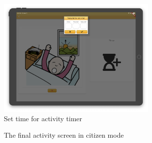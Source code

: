 \begin{figure}[H]
    \begin{center}
        \includegraphics[width=0.7\textwidth]{figures/FinalScreen/showActivityGuardianSetTimer.png}
    \end{center}
    \caption{Set time for activity timer}
    \label{fig:finalShowActivityGuardianSetTimer}
\end{figure}

\begin{figure}%
    \centering
    \quad
    \caption{The final activity screen in \gls{citizen} mode}%
    \label{fig:finalShowCitizenActivityModeFisk}%
\end{figure}

